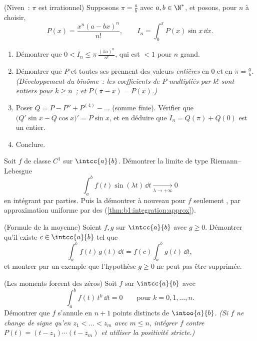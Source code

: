 \begin{exercise}[$\star\star\star$]\label{exo:b1:integration:9}
(Niven~: $\pi$ est irrationnel) Supposons $\pi = \frac ab$ avec $a, b
\in \N^*$, et posons, pour $n$ à choisir,
\[
P(x) = \frac{x^n (a - bx)^n}{n!},
\qquad
I_n = \int_0^{\pi} P(x)\sin x\, \dd x .
\]
\begin{enumerate}
  \item Démontrer que $0 < I_n \leq \pi\,\frac{(\pi a)^n}{n!}$, qui
        est $< 1$ pour $n$ grand.
  \item Démontrer que $P$ et toutes ses  prennent des valeurs
        \emph{entières} en $0$ et en $\pi = \frac ab$.
        \emph{(Développement du binôme~: les coefficients de $P$
        multipliés par $k!$ sont entiers pour $k \geq n$~; et
        $P(\pi - x) = P(x)$.)}
  \item Poser $Q = P - P'' + P^{(4)} - \dots$ (somme finie). Vérifier
        que $\bigl(Q'\sin x - Q\cos x\bigr)' = P \sin x$, et en
        déduire que $I_n = Q(\pi) + Q(0)$ est un entier.
  \item Conclure.
\end{enumerate}
\end{exercise}

\begin{exercise}[$\star\star\star$]\label{exo:b1:integration:10}
Soit $f$ de classe $C^1$ sur $\intcc{a}{b}$. Démontrer la limite de
type Riemann--Lebesgue
\[
\int_a^b f(t)\sin(\lambda t)\,\dd t \xrightarrow[\lambda \to
+\infty]{} 0
\]
en intégrant par parties. Puis la démontrer à nouveau pour $f$
seulement , par approximation uniforme par des  (\cref{thm:b1:integration:approx}).
\end{exercise}

\begin{exercise}[$\star\star$]\label{exo:b1:integration:11}
(Formule de la moyenne) Soient $f, g$  sur $\intcc{a}{b}$
avec $g \geq 0$. Démontrer qu'il existe $c \in \intcc{a}{b}$ tel que
\[
\int_a^b f(t)\,g(t)\,\dd t = f(c)\int_a^b g(t)\,\dd t ,
\]
et montrer par un exemple que l'hypothèse $g \geq 0$ ne peut pas être
supprimée.
\end{exercise}

\begin{exercise}[$\star\star\star$]\label{exo:b1:integration:12}
(Les moments forcent des zéros) Soit $f$  sur $\intcc{a}{b}$
avec
\[
\int_a^b f(t)\,t^k\,\dd t = 0 \qquad \text{pour } k = 0, 1,
\dots, n .
\]
Démontrer que $f$ s'annule en $n + 1$ points distincts de
$\intoo{a}{b}$. \emph{(Si $f$ ne change de signe qu'en $z_1 < \dots
< z_m$ avec $m \leq n$, intégrer $f$ contre $P(t) = (t - z_1)
\cdots (t - z_m)$ et utiliser la positivité stricte.)}
\end{exercise}

